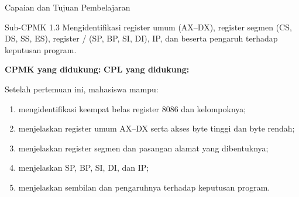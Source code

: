\documentclass[aspectratio=169,11pt]{beamer}
\begin{document}

\begin{frame}{Capaian dan Tujuan Pembelajaran}
\begin{block}{Sub-CPMK 1.3}
\small Mengidentifikasi register umum (AX--DX), register segmen
(CS, DS, SS, ES), register / (SP, BP, SI,
DI), IP, dan  beserta pengaruh  terhadap
keputusan program.
\end{block}

\vspace{0.1em}
{\small\textbf{CPMK yang didukung:} \quad\textbullet\quad
\textbf{CPL yang didukung:} \par}

\vspace{0.15em}
\begin{exampleblock}{Setelah pertemuan ini, mahasiswa mampu:}
\footnotesize
\begin{enumerate}
    \item mengidentifikasi keempat belas register 8086 dan
          kelompoknya;
    \item menjelaskan register umum AX--DX serta akses byte tinggi
          dan byte rendah;
    \item menjelaskan register segmen dan pasangan alamat yang
          dibentuknya;
    \item menjelaskan SP, BP, SI, DI, dan IP;
    \item menjelaskan sembilan  dan pengaruhnya terhadap
          keputusan program.
\end{enumerate}
\end{exampleblock}
\end{frame}
\end{document}
